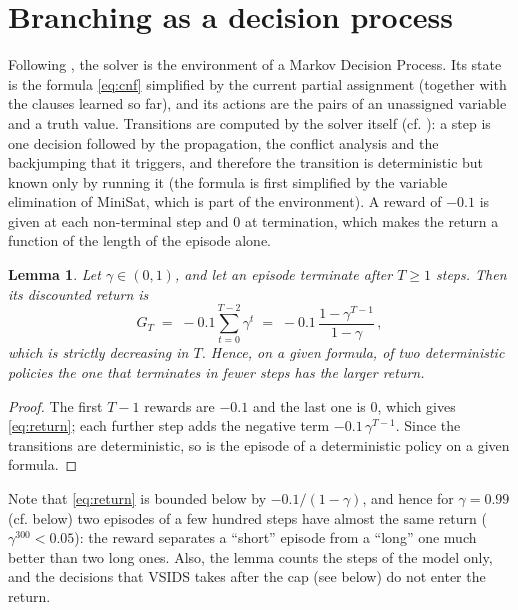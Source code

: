 \documentclass[11pt,a4paper]{article}
\newtheorem{lemma}{Lemma}
\begin{document}
\section{Branching as a decision process}\label{sec:problem}

Following \cite{Kurin2020}, the solver is the environment of a Markov Decision
Process. Its state is the formula \eqref{eq:cnf} simplified by the current
partial assignment (together with the clauses learned so far), and its actions
are the pairs of an unassigned variable and a truth value. Transitions are
computed by the solver itself (cf. \cite[section 3]{Kurin2020}): a step is one decision followed by the propagation, the
conflict analysis and the backjumping that it triggers, and therefore the
transition is deterministic but known only by running it (the formula is
first simplified by the variable elimination of MiniSat, which is part of the
environment). A reward of $-0.1$
is given at each non-terminal step and $0$ at termination, which makes the
return a function of the length of the episode alone.

\begin{lemma}\label{lem:return}
Let $\gamma \in (0, 1)$, and let an episode terminate after $T \ge 1$ steps.
Then its discounted return is
\begin{equation}\label{eq:return}
  G_T \;=\; -0.1 \sum_{t=0}^{T-2} \gamma^t \;=\; -0.1\, \frac{1 - \gamma^{T-1}}{1 - \gamma} \, ,
\end{equation}
which is strictly decreasing in $T$. Hence, on a given formula, of two
deterministic policies the one that terminates in fewer steps has the larger
return.
\end{lemma}

\begin{proof}
The first $T-1$ rewards are $-0.1$ and the last one is $0$, which gives
\eqref{eq:return}; each further step adds the negative term $-0.1\,\gamma^{T-1}$.
Since the transitions are deterministic, so is the episode of a deterministic
policy on a given formula.
\end{proof}

\noindent
Note that \eqref{eq:return} is bounded below by $-0.1/(1 - \gamma)$, and hence
for $\gamma = 0.99$ (cf. below) two episodes of a few hundred steps have
almost the same return ($\gamma^{300} < 0.05$): the reward separates a ``short''
episode from a ``long'' one much better than two long ones. Also, the lemma counts
the steps of the model only, and the decisions that VSIDS takes after the cap
(see below) do not enter the return.
\end{document}
